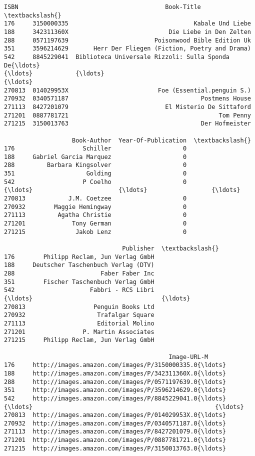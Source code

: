 \documentclass[11pt]{article}
\makeatletter
\newcommand{\boxspacing}{\kern\kvtcb@left@rule\kern\kvtcb@boxsep}
\newcommand{\prompt}[4]{
        {\ttfamily\llap{{\color{#2}[#3]:\hspace{3pt}#4}}\vspace{-\baselineskip}}
    }
\makeatother
\begin{document}
            \begin{tcolorbox}[breakable, size=fbox, boxrule=.5pt, pad at break*=1mm, opacityfill=0]
\prompt{Out}{outcolor}{16}{\boxspacing}
\begin{Verbatim}[commandchars=\\\{\}]
              ISBN                                         Book-Title  \textbackslash{}
176     3150000335                                   Kabale Und Liebe
188     342311360X                            Die Liebe in Den Zelten
288     0571197639                        Poisonwood Bible Edition Uk
351     3596214629       Herr Der Fliegen (Fiction, Poetry and Drama)
542     8845229041  Biblioteca Universale Rizzoli: Sulla Sponda De{\ldots}
{\ldots}            {\ldots}                                                {\ldots}
270813  014029953X                         Foe (Essential.penguin S.)
270932  0340571187                                     Postmens House
271113  8427201079                           El Misterio De Sittaford
271201  0887781721                                          Tom Penny
271215  3150013763                                     Der Hofmeister

                   Book-Author  Year-Of-Publication  \textbackslash{}
176                   Schiller                    0
188     Gabriel Garcia Marquez                    0
288         Barbara Kingsolver                    0
351                    Golding                    0
542                   P Coelho                    0
{\ldots}                        {\ldots}                  {\ldots}
270813            J.M. Coetzee                    0
270932        Maggie Hemingway                    0
271113         Agatha Christie                    0
271201             Tony German                    0
271215              Jakob Lenz                    0

                                 Publisher  \textbackslash{}
176        Philipp Reclam, Jun Verlag GmbH
188     Deutscher Taschenbuch Verlag (DTV)
288                        Faber Faber Inc
351        Fischer Taschenbuch Verlag GmbH
542                     Fabbri - RCS Libri
{\ldots}                                    {\ldots}
270813                   Penguin Books Ltd
270932                    Trafalgar Square
271113                    Editorial Molino
271201                P. Martin Associates
271215     Philipp Reclam, Jun Verlag GmbH

                                              Image-URL-M
176     http://images.amazon.com/images/P/3150000335.0{\ldots}
188     http://images.amazon.com/images/P/342311360X.0{\ldots}
288     http://images.amazon.com/images/P/0571197639.0{\ldots}
351     http://images.amazon.com/images/P/3596214629.0{\ldots}
542     http://images.amazon.com/images/P/8845229041.0{\ldots}
{\ldots}                                                   {\ldots}
270813  http://images.amazon.com/images/P/014029953X.0{\ldots}
270932  http://images.amazon.com/images/P/0340571187.0{\ldots}
271113  http://images.amazon.com/images/P/8427201079.0{\ldots}
271201  http://images.amazon.com/images/P/0887781721.0{\ldots}
271215  http://images.amazon.com/images/P/3150013763.0{\ldots}


\end{Verbatim}
\end{tcolorbox}
\end{document}
